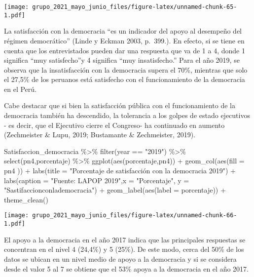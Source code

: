 \documentclass[
]{book}
\newenvironment{Shaded}{\begin{snugshade}}{\end{snugshade}}
\newcommand{\AttributeTok}[1]{\textcolor[rgb]{0.77,0.63,0.00}{#1}}
\newcommand{\FunctionTok}[1]{\textcolor[rgb]{0.00,0.00,0.00}{#1}}
\newcommand{\NormalTok}[1]{#1}
\newcommand{\SpecialCharTok}[1]{\textcolor[rgb]{0.00,0.00,0.00}{#1}}
\newcommand{\StringTok}[1]{\textcolor[rgb]{0.31,0.60,0.02}{#1}}
\begin{document}
\texttt{[image: grupo\_2021\_mayo\_junio\_files/figure-latex/unnamed-chunk-65-1.pdf]}

La satisfacción con la democracia ``es un indicador del apoyo al desempeño del régimen democrático'' (Linde y Eckman 2003, p.~399.). En efecto, si se tiene en cuenta que los entrevistados pueden dar una respuesta que va de 1 a 4, donde 1 significa ``muy satisfecho''y 4 significa ``muy insatisfecho.'' Para el año 2019, se observa que la insatisfacción con la democracia supera el 70\%, mientras que solo el 27,5\% de los peruanos está satisfecho con el funcionamiento de la democracia en el Perú.

Cabe destacar que si bien la satisfacción pública con el funcionamiento de la democracia también ha descendido, la tolerancia a los golpes de estado ejecutivos - es decir, que el Ejecutivo cierre el Congreso- ha continuado en aumento (Zechmeister \& Lupu, 2019; Bustamante \& Zechmeister, 2019).

\begin{Shaded}
\begin{Highlighting}[]
\NormalTok{Satisfaccion\_democracia }\SpecialCharTok{\%\textgreater{}\%}
  \FunctionTok{filter}\NormalTok{(year }\SpecialCharTok{==} \StringTok{"2019"}\NormalTok{) }\SpecialCharTok{\%\textgreater{}\%}
  \FunctionTok{select}\NormalTok{(pn4,porcentaje) }\SpecialCharTok{\%\textgreater{}\%}
  \FunctionTok{ggplot}\NormalTok{(}\FunctionTok{aes}\NormalTok{(porcentaje,pn4))  }\SpecialCharTok{+} 
  \FunctionTok{geom\_col}\NormalTok{(}\FunctionTok{aes}\NormalTok{(}\AttributeTok{fill =}\NormalTok{ pn4 )) }\SpecialCharTok{+}
  \FunctionTok{labs}\NormalTok{(}\AttributeTok{title =} \StringTok{"Porcentaje de satisfacción con la democracia 2019"}\NormalTok{) }\SpecialCharTok{+}
  \FunctionTok{labs}\NormalTok{(}\AttributeTok{caption =} \StringTok{"Fuente: LAPOP 2019"}\NormalTok{,}\AttributeTok{x =} \StringTok{"Porcentaje"}\NormalTok{, }\AttributeTok{y =} \StringTok{"Sastifaccionconlademocracia"}\NormalTok{) }\SpecialCharTok{+}
  \FunctionTok{geom\_label}\NormalTok{(}\FunctionTok{aes}\NormalTok{(}\AttributeTok{label =}\NormalTok{ porcentaje)) }\SpecialCharTok{+}
  \FunctionTok{theme\_clean}\NormalTok{()}
\end{Highlighting}
\end{Shaded}

\texttt{[image: grupo\_2021\_mayo\_junio\_files/figure-latex/unnamed-chunk-66-1.pdf]}

El apoyo a la democracia en el año 2017 indica que las principales respuestas se concentran en el nivel 4 (24,4\%) y 5 (25\%). De este modo, cerca del 50\% de los datos se ubican en un nivel medio de apoyo a la democracia y si se considera desde el valor 5 al 7 se obtiene que el 53\% apoya a la democracia en el año 2017.
\end{document}

